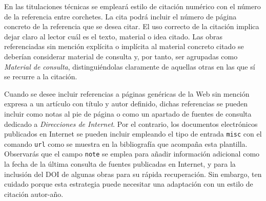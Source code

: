 En las titulaciones técnicas se empleará estilo de citación numérico con el número de la referencia entre corchetes. La cita podrá incluir el número de página concreto de la referencia que se desea citar. El uso correcto de la citación implica dejar claro al lector cuál es el texto, material o idea citado. Las obras referenciadas sin mención explícita o implícita al material concreto citado se deberían considerar material de consulta y, por tanto, ser agrupadas como \emph{Material de consulta}, distinguiéndolas claramente de aquellas otras en las que sí se recurre a la citación.


Cuando se desee incluir referencias a páginas genéricas de la Web sin mención expresa a un artículo con título y autor definido, dichas referencias se pueden incluir como notas al pie de página o como un apartado de fuentes de consulta dedicado a \emph{Direcciones de Internet}. Por el contrario, los documentos electrónicos publicados en Internet se pueden incluir empleando el tipo de entrada \texttt{misc} con el comando \texttt{url} como se muestra en la bibliografía que acompaña esta plantilla. Observarás que el campo \texttt{note} se emplea para añadir información adicional como la fecha de la última consulta de fuentes publicadas en Internet, y para la inclusión del DOI de algunas obras para su rápida recuperación. Sin embargo, ten cuidado porque esta estrategia puede necesitar una adaptación con un estilo de citación autor-año.







